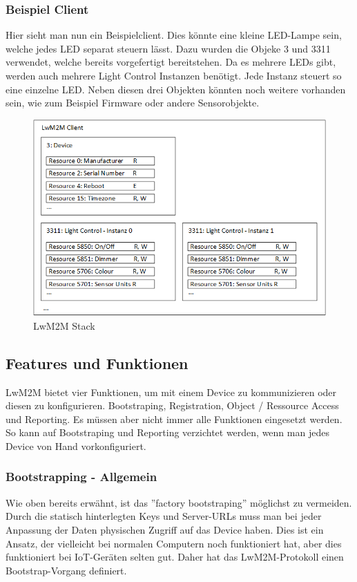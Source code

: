 \subsubsection{Beispiel Client}
Hier sieht man nun ein Beispielclient. Dies könnte eine kleine LED-Lampe sein, welche jedes LED separat steuern lässt. Dazu wurden die Objeke 3 und 3311 verwendet, welche bereits vorgefertigt bereitstehen. Da es mehrere LEDs gibt, werden auch mehrere Light Control Instanzen benötigt. Jede Instanz steuert so eine einzelne LED.
Neben diesen drei Objekten könnten noch weitere vorhanden sein, wie zum Beispiel Firmware oder andere Sensorobjekte.
\begin{figure}[H]
\includegraphics[scale=0.65]{../02_Analyse/images/lwm2m/lwm2m_client.png}
\caption{LwM2M Stack}
\end{figure}

\newpage

\subsection{Features und Funktionen}
LwM2M bietet vier Funktionen, um mit einem Device zu kommunizieren oder diesen zu konfigurieren. Bootstraping, Registration, Object / Ressource Access und Reporting. Es müssen aber nicht immer alle Funktionen eingesetzt werden. So kann auf Bootstraping und Reporting verzichtet werden, wenn man jedes Device von Hand vorkonfiguriert.
\subsubsection{Bootstrapping - Allgemein}
Wie oben bereits erwähnt, ist das ''factory bootstraping'' möglichst zu vermeiden. Durch die statisch hinterlegten Keys und Server-URLs muss man bei jeder Anpassung der Daten physischen Zugriff auf das Device haben. Dies ist ein Ansatz, der vielleicht bei normalen Computern noch funktioniert hat, aber dies funktioniert bei IoT-Geräten selten gut. Daher hat das LwM2M-Protokoll einen Bootstrap-Vorgang definiert.


